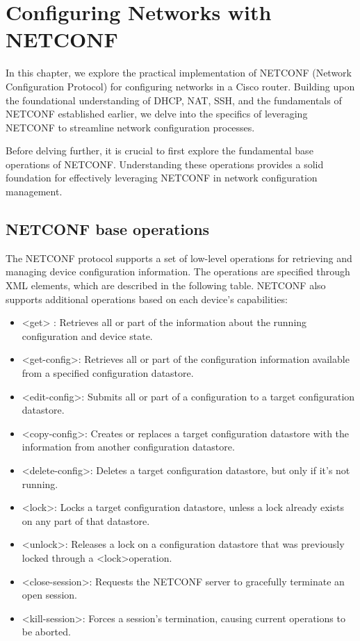 \chapter{Configuring Networks with NETCONF}

    In this chapter, we explore the practical implementation of NETCONF (Network Configuration Protocol) for configuring networks in a Cisco router. Building upon the foundational understanding of DHCP, NAT, SSH, and the fundamentals of NETCONF established earlier, we delve into the specifics of leveraging NETCONF to streamline network configuration processes.

    Before delving further, it is crucial to first explore the fundamental base operations of NETCONF. Understanding these operations provides a solid foundation for effectively leveraging NETCONF in network configuration management.

\section{NETCONF base operations}

The NETCONF protocol supports a set of low-level operations for retrieving and managing device configuration information. The operations are specified through XML elements, which are described in the following table. NETCONF also supports additional operations based on each device's capabilities:

\begin{itemize}
    \item \textless{get}\textgreater{} : Retrieves all or part of the information about the running configuration and device state.
    \item \textless get-config\textgreater : Retrieves all or part of the configuration information available from a specified configuration datastore.
    \item \textless edit-config\textgreater : Submits all or part of a configuration to a target configuration datastore.
    \item \textless copy-config\textgreater : Creates or replaces a target configuration datastore with the information from another configuration datastore.
    \item \textless delete-config\textgreater : Deletes a target configuration datastore, but only if it's not running.
    \item \textless lock\textgreater : Locks a target configuration datastore, unless a lock already exists on any part of that datastore.
    \item \textless unlock\textgreater : Releases a lock on a configuration datastore that was previously locked through a \textless lock\textgreater operation.
    \item \textless close-session\textgreater : Requests the NETCONF server to gracefully terminate an open session.
    \item \textless kill-session\textgreater : Forces a session's termination, causing current operations to be aborted.
\end{itemize}


